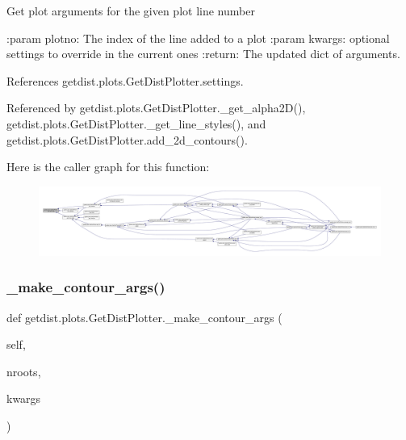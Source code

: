\begin{DoxyVerb}Get plot arguments for the given plot line number

:param plotno: The index of the line added to a plot
:param kwargs: optional settings to override in the current ones
:return: The updated dict of arguments.
\end{DoxyVerb}
 

References getdist.\+plots.\+Get\+Dist\+Plotter.\+settings.



Referenced by getdist.\+plots.\+Get\+Dist\+Plotter.\+\_\+get\+\_\+alpha2\+D(), getdist.\+plots.\+Get\+Dist\+Plotter.\+\_\+get\+\_\+line\+\_\+styles(), and getdist.\+plots.\+Get\+Dist\+Plotter.\+add\+\_\+2d\+\_\+contours().

Here is the caller graph for this function\+:
\nopagebreak
\begin{figure}[H]
\begin{center}
\leavevmode
\includegraphics[width=350pt]{classgetdist_1_1plots_1_1GetDistPlotter_a3611eb8b23f9f095922b216ead8d83ce_icgraph}
\end{center}
\end{figure}
\mbox{\label{classgetdist_1_1plots_1_1GetDistPlotter_af3c4b93770391c350949913b5f3eeaa8}} 
\subsubsection{\texorpdfstring{\+\_\+make\+\_\+contour\+\_\+args()}{\_make\_contour\_args()}}
{\footnotesize\ttfamily def getdist.\+plots.\+Get\+Dist\+Plotter.\+\_\+make\+\_\+contour\+\_\+args (\begin{DoxyParamCaption}\item[{}]{self,  }\item[{}]{nroots,  }\item[{}]{kwargs }\end{DoxyParamCaption})\hspace{0.3cm}{\ttfamily [private]}}



